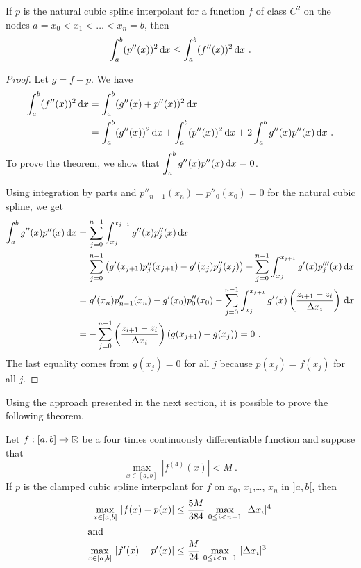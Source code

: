 \begin{theorem}
If $p$ is the natural cubic spline interpolant for a function $f$ of
class $C^2$ on the nodes $a = x_0 < x_1 < \ldots < x_n=b$, then
\[
\int_a^b (p''(x))^2 \,\mathrm{d}x \leq \int_a^b (f''(x))^2 \,\mathrm{d}x \ .
\]
\end{theorem}

\begin{proof}
Let $g = f - p$.  We have
\begin{align*}
\int_a^b (f''(x))^2\,\mathrm{d}x &= \int_a^b (g''(x)+p''(x))^2 \,\mathrm{d}x \\
&= \int_a^b (g''(x))^2\,\mathrm{d}x + \int_a^b (p''(x))^2 \,\mathrm{d}x
+ 2\int_a^b g''(x) p''(x)\,\mathrm{d}x \ .
\end{align*}
To prove the theorem, we show that
$\displaystyle \int_a^b g''(x) p''(x)\,\mathrm{d}x = 0$.

Using integration by parts and $p''_{n-1}(x_n)=p''_0(x_0) = 0$ for
the natural cubic spline, we get
\begin{align*}
\int_a^b g''(x) p''(x)\,\mathrm{d}x &= \sum_{j=0}^{n-1}
\int_{x_j}^{x_{j+1}} g''(x) p''_j(x)\,\mathrm{d}x \\
&= \sum_{j=0}^{n-1} \left(g'(x_{j+1})p''_j(x_{j+1})
- g'(x_j)p''_j(x_j) \right) -
\sum_{j=0}^{n-1} \int_{x_j}^{x_{j+1}} g'(x) p'''_j(x)\,\mathrm{d}x \\
&= g'(x_n)p''_{n-1}(x_n) - g'(x_0)p''_0(x_0) -
\sum_{j=0}^{n-1} \int_{x_j}^{x_{j+1}} g'(x)
\left( \frac{z_{i+1}-z_i}{\Delta{x_i}} \right) \,\mathrm{d}x \\
&= - \sum_{j=0}^{n-1} \left( \frac{z_{i+1}-z_i}{\Delta{x_i}} \right)
\left( g(x_{j+1})-g(x_j) \right) = 0 \ .
\end{align*}
The last equality comes from $g(x_j)=0$ for all $j$ because
$p(x_j)=f(x_j)$ for all $j$.
\end{proof}

Using the approach presented in the next section, it is possible to
prove the following theorem.

\begin{theorem}
Let $f:[a,b]\rightarrow \mathbb{R}$ be a four times continuously
differentiable function and suppose that
\[
\max_{x \in [a,b]}\,|f^{(4)}(x)| < M \ .
\]
If $p$ is the clamped cubic spline interpolant for $f$ on $x_0$,
$x_1$,\ldots, $x_n$ in $]a,b[$, then
\begin{align*}
\max_{x \in [a,b]}\,|f(x)-p(x)| &\leq \frac{5M}{384}\,
\max_{0\leq i<n-1}\,|\Delta{x_i}|^4 \\
\intertext{and}
\max_{x \in [a,b]}\,|f'(x)-p'(x)| &\leq \frac{M}{24}\,
\max_{0\leq i<n-1}\,|\Delta{x_i}|^3 \ .
\end{align*}
\end{theorem}

